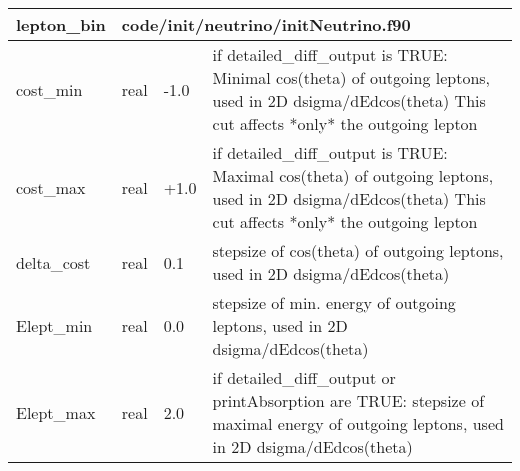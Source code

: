 \documentclass{article}
\begin{document}
\begin{longtable}{llll}
\toprule
\textbf{\large{lepton\_bin}} & \multicolumn{3}{l}{\footnotesize{code/init/neutrino/initNeutrino.f90}}\\*
\midrule
\endfirsthead
\midrule
\endhead
cost\_min & \begin{minipage}[t]{2cm}real\end{minipage} & \begin{minipage}[t]{2cm}-1.0\end{minipage} & \begin{minipage}[t]{12cm}if detailed\_diff\_output is TRUE: Minimal cos(theta) of outgoing leptons, used in 2D dsigma/dEdcos(theta) This cut affects *only* the outgoing lepton\end{minipage}\\*
\midrule
cost\_max & \begin{minipage}[t]{2cm}real\end{minipage} & \begin{minipage}[t]{2cm}+1.0\end{minipage} & \begin{minipage}[t]{12cm}if detailed\_diff\_output is TRUE: Maximal cos(theta) of outgoing leptons, used in 2D dsigma/dEdcos(theta) This cut affects *only* the outgoing lepton\end{minipage}\\*
\midrule
delta\_cost & \begin{minipage}[t]{2cm}real\end{minipage} & \begin{minipage}[t]{2cm}0.1\end{minipage} & \begin{minipage}[t]{12cm}stepsize of cos(theta) of outgoing leptons, used in 2D dsigma/dEdcos(theta)\end{minipage}\\*
\midrule
Elept\_min & \begin{minipage}[t]{2cm}real\end{minipage} & \begin{minipage}[t]{2cm}0.0\end{minipage} & \begin{minipage}[t]{12cm}stepsize of min. energy of outgoing leptons, used in 2D dsigma/dEdcos(theta)\end{minipage}\\*
\midrule
Elept\_max & \begin{minipage}[t]{2cm}real\end{minipage} & \begin{minipage}[t]{2cm}2.0\end{minipage} & \begin{minipage}[t]{12cm}if detailed\_diff\_output or printAbsorption are TRUE: stepsize of maximal energy of outgoing leptons, used in 2D dsigma/dEdcos(theta)\end{minipage}\\*

\end{longtable}
\end{document}
